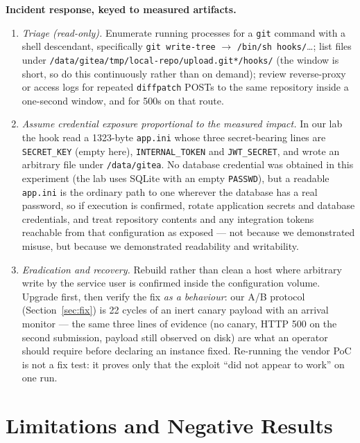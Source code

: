 \textbf{Incident response, keyed to measured artifacts.}
\begin{enumerate}
\item \emph{Triage (read-only).} Enumerate running processes for a
\texttt{git} command with a shell descendant, specifically
\texttt{git write-tree} $\rightarrow$ \texttt{/bin/sh\allowbreak
hooks/}\ldots; list files under
\texttt{/data/gitea/tmp/\allowbreak local-repo/\allowbreak upload.git*/hooks/}
(the window is short, so do this continuously rather than on demand); review
reverse-proxy or access logs for repeated \texttt{diffpatch} POSTs to the same
repository inside a one-second window, and for 500s on that route.
\item \emph{Assume credential exposure proportional to the measured impact.}
In our lab the hook read a 1323-byte \texttt{app.ini} whose three secret-bearing
lines are \texttt{SECRET\_KEY} (empty here), \texttt{INTERNAL\_TOKEN} and
\texttt{JWT\_SECRET}, and wrote an arbitrary file under \texttt{/data/gitea}. No
database credential was obtained in this experiment (the lab uses SQLite with an
empty \texttt{PASSWD}), but a readable \texttt{app.ini} is the ordinary path to one
wherever the database has a real password, so if execution is confirmed, rotate
application secrets and database credentials,
and treat repository contents and any integration tokens reachable from that
configuration as exposed --- not because we demonstrated misuse, but because
we demonstrated readability and writability.
\item \emph{Eradication and recovery.} Rebuild rather than clean a host where
arbitrary write by the service user is confirmed inside the configuration
volume. Upgrade first, then verify the fix \emph{as a behaviour}: our A/B
protocol (Section~\ref{sec:fix}) is 22 cycles of an inert canary payload with
an arrival monitor --- the same three lines of evidence (no canary, HTTP 500
on the second submission, payload still observed on disk) are what an operator
should require before declaring an instance fixed. Re-running the vendor PoC
is not a fix test: it proves only that the exploit ``did not appear to work''
on one run.
\end{enumerate}

\section{Limitations and Negative Results}
\label{sec:limitations}

